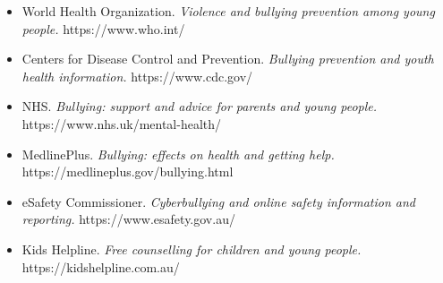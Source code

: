 \begin{itemize}
    \item World Health Organization. \textit{Violence and bullying prevention among young people.} https://www.who.int/
    \item Centers for Disease Control and Prevention. \textit{Bullying prevention and youth health information.} https://www.cdc.gov/
    \item NHS. \textit{Bullying: support and advice for parents and young people.} https://www.nhs.uk/mental-health/
    \item MedlinePlus. \textit{Bullying: effects on health and getting help.} https://medlineplus.gov/bullying.html
    \item eSafety Commissioner. \textit{Cyberbullying and online safety information and reporting.} https://www.esafety.gov.au/
    \item Kids Helpline. \textit{Free counselling for children and young people.} https://kidshelpline.com.au/
\end{itemize}
